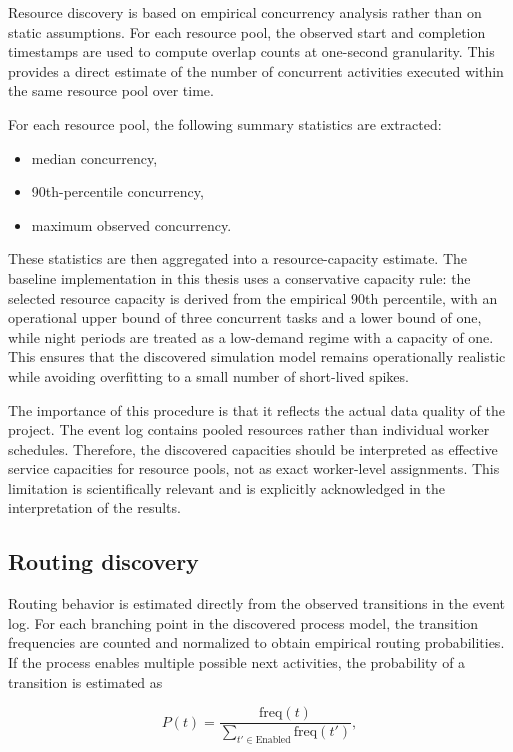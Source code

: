Resource discovery is based on empirical concurrency analysis rather than on static assumptions.
For each resource pool, the observed start and completion timestamps are used to compute overlap counts at one-second granularity.
This provides a direct estimate of the number of concurrent activities executed within the same resource pool over time.

For each resource pool, the following summary statistics are extracted:
\begin{itemize}
    \item median concurrency,
    \item 90th-percentile concurrency,
    \item maximum observed concurrency.
\end{itemize}

These statistics are then aggregated into a resource-capacity estimate.
The baseline implementation in this thesis uses a conservative capacity rule:
the selected resource capacity is derived from the empirical 90th percentile, with an operational upper bound of three concurrent tasks and a lower bound of one, while night periods are treated as a low-demand regime with a capacity of one.
This ensures that the discovered simulation model remains operationally realistic while avoiding overfitting to a small number of short-lived spikes.

The importance of this procedure is that it reflects the actual data quality of the project.
The event log contains pooled resources rather than individual worker schedules.
Therefore, the discovered capacities should be interpreted as effective service capacities for resource pools, not as exact worker-level assignments.
This limitation is scientifically relevant and is explicitly acknowledged in the interpretation of the results.

\subsection{Routing discovery}

Routing behavior is estimated directly from the observed transitions in the event log.
For each branching point in the discovered process model, the transition frequencies are counted and normalized to obtain empirical routing probabilities.
If the process enables multiple possible next activities, the probability of a transition is estimated as

\begin{equation}
P(t) = \frac{\mathrm{freq}(t)}{\sum_{t' \in \mathrm{Enabled}} \mathrm{freq}(t')},
\end{equation}

